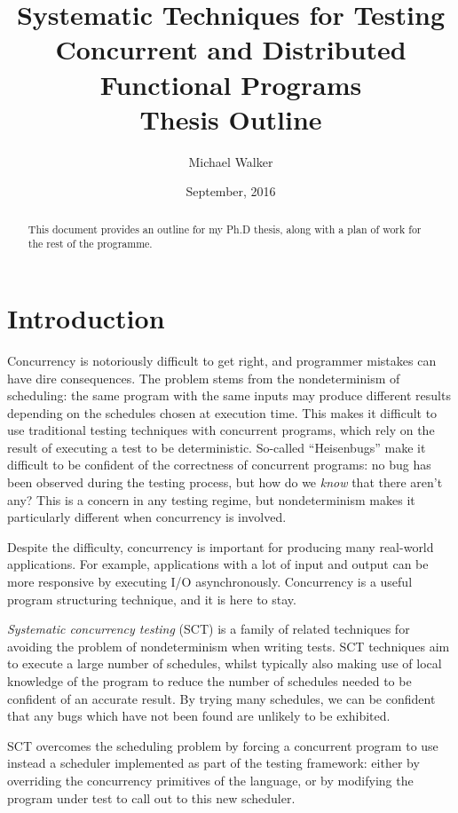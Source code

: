 \documentclass{article}
\title{Systematic Techniques for Testing Concurrent and Distributed Functional Programs \\ \large Thesis Outline}
\author{Michael Walker}
\date{September, 2016}
\begin{document}
\maketitle

\begin{abstract}
  This document provides an outline for my Ph.D thesis, along with a
  plan of work for the rest of the programme.
\end{abstract}

\tableofcontents

\pagebreak

\section{Introduction}

Concurrency is notoriously difficult to get right\cite{yang2013}, and
programmer mistakes can have dire consequences\cite{leveson1993}. The
problem stems from the nondeterminism of scheduling: the same program
with the same inputs may produce different results depending on the
schedules chosen at execution time. This makes it difficult to use
traditional testing techniques with concurrent programs, which rely on
the result of executing a test to be deterministic. So-called
``Heisenbugs'' make it difficult to be confident of the correctness of
concurrent programs: no bug has been observed during the testing
process, but how do we \emph{know} that there aren't any? This is a
concern in any testing regime, but nondeterminism makes it
particularly different when concurrency is involved.

Despite the difficulty, concurrency is important for producing many
real-world applications. For example, applications with a lot of input
and output can be more responsive by executing I/O asynchronously.
Concurrency is a useful program structuring technique, and it is here
to stay.

\emph{Systematic concurrency testing}
(SCT)\cite{emmi2011,musuvathi2007,musuvathi2008,thomson2014} is a
family of related techniques for avoiding the problem of
nondeterminism when writing tests. SCT techniques aim to execute a
large number of schedules, whilst typically also making use of local
knowledge of the program to reduce the number of schedules needed to
be confident of an accurate result. By trying many schedules, we can
be confident that any bugs which have not been found are unlikely to
be exhibited.

SCT overcomes the scheduling problem by forcing a concurrent program
to use instead a scheduler implemented as part of the testing
framework: either by overriding the concurrency primitives of the
language, or by modifying the program under test to call out to this
new scheduler.
\end{document}
